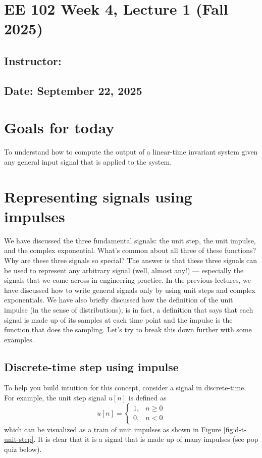 \documentclass{ee102_notes}
\renewcommand{\releasedate}{September 22, 2025}
\begin{document}
\section*{EE 102 Week 4, Lecture 1 (Fall 2025)}
\subsection*{Instructor: \instructor}
\subsection*{Date: \releasedate}

\section{Goals for today}
To understand how to compute the output of a linear-time invariant system given any general input signal that is applied to the system. 
\section{Representing signals using impulses}
We have discussed the three fundamental signals: the unit step, the unit impulse, and the complex exponential. What's common about all three of these functions? Why are these three signals so special? The answer is that these three signals can be used to represent any arbitrary signal (well, almost any!) --- especially the signals that we come across in engineering practice. In the previous lectures, we have discussed how to write general signals only by using unit steps and complex exponentials. We have also briefly discussed how the definition of the unit impulse (in the sense of distributions), is in fact, a definition that says that each signal is made up of its samples at each time point and the impulse is the function that does the sampling. Let's try to break this down further with some examples. 

\subsection{Discrete-time step using impulse}
To help you build intuition for this concept, consider a signal in discrete-time. For example, the unit step signal $u[n]$ is defined as
\[
u[n] = \begin{cases}
1, & n \geq 0 \\
0, & n < 0
\end{cases}
\]
which can be visualized as a train of unit impulses as shown in Figure \ref{fig:d-t-unit-step}. It is clear that it is a signal that is made up of many impulses (see pop quiz below).
\end{document}

